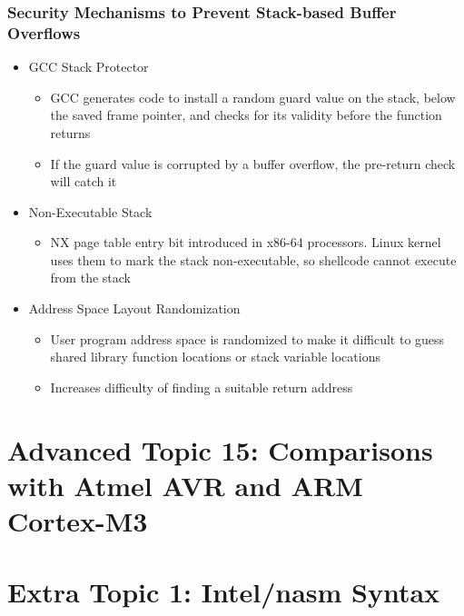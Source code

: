 \documentclass[11pt,xcolor=dvipsnames]{beamer}
\begin{document}
\begin{frame}[fragile,t]
\frametitle{Security Mechanisms to Prevent Stack-based Buffer Overflows}
\begin{itemize}
  \item GCC Stack Protector
  \begin{itemize}
    \item GCC generates code to install a random guard value on the stack, below the saved frame pointer, and checks for its validity before the function returns
    \item If the guard value is corrupted by a buffer overflow, the pre-return check will catch it
  \end{itemize}
  \pause
  \item Non-Executable Stack
  \begin{itemize}
    \item NX page table entry bit introduced in x86-64 processors. Linux kernel uses them to mark the stack non-executable, so shellcode cannot execute from the stack
  \end{itemize}
  \pause
  \item Address Space Layout Randomization
  \begin{itemize}
    \item User program address space is randomized to make it difficult to guess shared library function locations or stack variable locations
    \item Increases difficulty of finding a suitable return address
  \end{itemize}
\end{itemize}
\end{frame}

\section{Advanced Topic 15: Comparisons with Atmel AVR and ARM Cortex-M3}

\section{Extra Topic 1: Intel/nasm Syntax}
\end{document}
